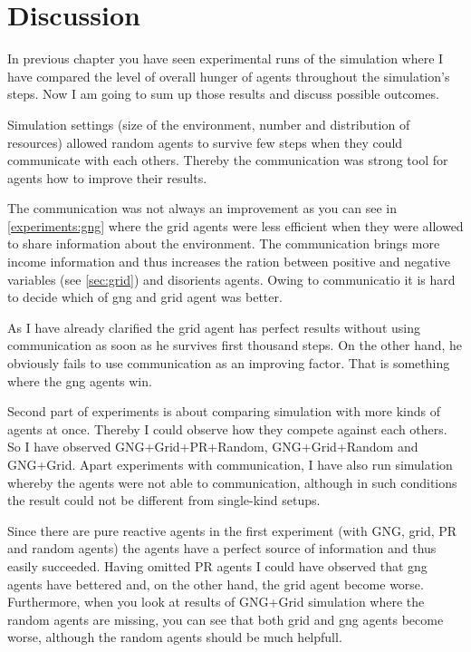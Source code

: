 \chapter{Discussion}

In previous chapter you have seen experimental runs of the simulation where I have compared the level of overall hunger of agents throughout the simulation's steps. Now I am going to sum up those results and discuss possible outcomes.


Simulation settings (size of the environment, number and distribution of resources) allowed random agents to survive few steps when they could communicate with each others. Thereby the communication was strong tool for agents how to improve their results.

The communication was not always an improvement as you can see in \ref{experiments:gng} where the grid agents were less efficient when they were allowed to share information about the environment. The communication brings more income information and thus increases the ration between positive and negative variables (see \ref{sec:grid}) and disorients agents. Owing to communicatio it is hard to decide which of gng and grid agent was better.

As I have already clarified the grid agent has perfect results without using communication as soon as he survives first thousand steps. On the other hand, he obviously fails to use communication as an improving factor. That is something where the gng agents win.


Second part of experiments is about comparing simulation with more kinds of agents at once. Thereby I could observe how they compete against each others. So I have observed GNG+Grid+PR+Random, GNG+Grid+Random and GNG+Grid. Apart experiments with communication, I have also run simulation whereby the agents were not able to communication, although in such conditions the result could not be different from single-kind setups.

Since there are pure reactive agents in the first experiment (with GNG, grid, PR and random agents) the agents have a perfect source of information and thus easily succeeded. Having omitted PR agents I could have observed that gng agents have bettered and, on the other hand, the grid agent become worse. Furthermore, when you look at results of GNG+Grid simulation where the random agents are missing, you can see that both grid and gng agents become worse, although the random agents should be much helpfull. 

